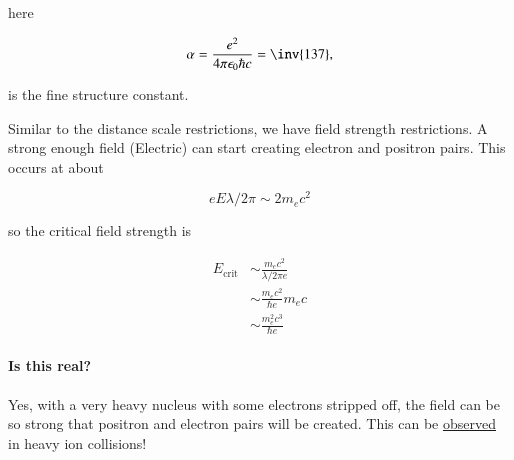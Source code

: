 here

\begin{equation}\label{eqn:relativisticElectrodynamicsL27:290}
\alpha = \frac{e^2}{4 \pi \epsilon_0 \hbar c } = \inv{137},
\end{equation}

is the fine structure constant.

Similar to the distance scale restrictions, we have field strength restrictions.  A strong enough field (Electric) can start creating electron and positron pairs.  This occurs at about 

\begin{equation}\label{eqn:relativisticElectrodynamicsL27:310}
e E \lambda/2\pi \sim 2 m_e c^2 
\end{equation}

so the critical field strength is

\begin{align*}
E_{\text{crit}} 
&\sim \frac{m_e c^2 }{\lambda/2\pi e}  \\
&\sim \frac{m_e c^2 }{\hbar e} m_e c  \\
&\sim \frac{m_e^2 c^3}{\hbar e}
\end{align*}

\paragraph{Is this real?}

Yes, with a very heavy nucleus with some electrons stripped off, the field can be so strong that positron and electron pairs will be created.  This can be \underline{observed} in heavy ion collisions!

\EndArticle
